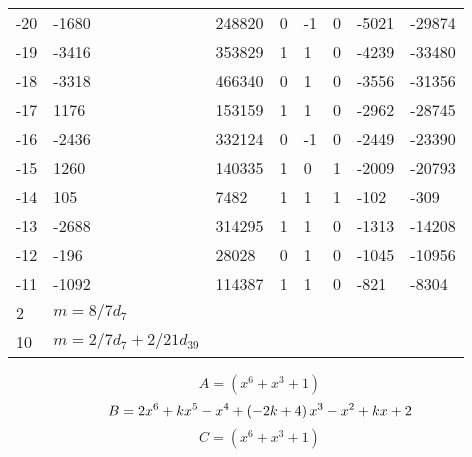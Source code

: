 \documentclass{amsart}
\begin{document}
\begin{longtable}{|l|l|l|lllll|}
-20&-1680&248820&0&-1&0&-5021&-29874\\
-19&-3416&353829&1&1&0&-4239&-33480\\
-18&-3318&466340&0&1&0&-3556&-31356\\
-17&1176&153159&1&1&0&-2962&-28745\\
-16&-2436&332124&0&-1&0&-2449&-23390\\
-15&1260&140335&1&0&1&-2009&-20793\\
-14&105&7482&1&1&1&-102&-309\\
-13&-2688&314295&1&1&0&-1313&-14208\\
-12&-196&28028&0&1&0&-1045&-10956\\
-11&-1092&114387&1&1&0&-821&-8304\\
2&$m=8/7d_{7}$&&\multicolumn{5}{c|}{}\\
10&$m=2/7d_{7}+2/21d_{39}$&&\multicolumn{5}{c|}{}\\
\hline
\end{longtable}
$$A=(x^6
 + x^3
 + 1)$$
$$B=2\*x^6
 + k\*x^5
 - x^4
 + \left(-2\*k
 + 4\right) \*x^3
 - x^2
 + k\*x
 + 2$$
$$C=(x^6
 + x^3
 + 1)$$
\end{document}
